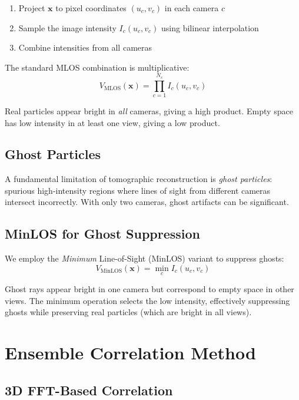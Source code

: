 \documentclass[11pt,a4paper]{article}
\begin{document}
\begin{enumerate}
    \item Project $\mathbf{x}$ to pixel coordinates $(u_c, v_c)$ in each camera $c$
    \item Sample the image intensity $I_c(u_c, v_c)$ using bilinear interpolation
    \item Combine intensities from all cameras
\end{enumerate}

The standard MLOS combination is multiplicative:
\begin{equation}
    V_{\text{MLOS}}(\mathbf{x}) = \prod_{c=1}^{N_c} I_c(u_c, v_c)
\end{equation}

Real particles appear bright in \textit{all} cameras, giving a high product. Empty space has low intensity in at least one view, giving a low product.

\subsection{Ghost Particles}

A fundamental limitation of tomographic reconstruction is \textit{ghost particles}: spurious high-intensity regions where lines of sight from different cameras intersect incorrectly. With only two cameras, ghost artifacts can be significant.

\subsection{MinLOS for Ghost Suppression}

We employ the \textit{Minimum} Line-of-Sight (MinLOS) variant to suppress ghosts:
\begin{equation}
    V_{\text{MinLOS}}(\mathbf{x}) = \min_{c} I_c(u_c, v_c)
\end{equation}

Ghost rays appear bright in one camera but correspond to empty space in other views. The minimum operation selects the low intensity, effectively suppressing ghosts while preserving real particles (which are bright in all views).

\section{Ensemble Correlation Method}

\subsection{3D FFT-Based Correlation}
\end{document}
